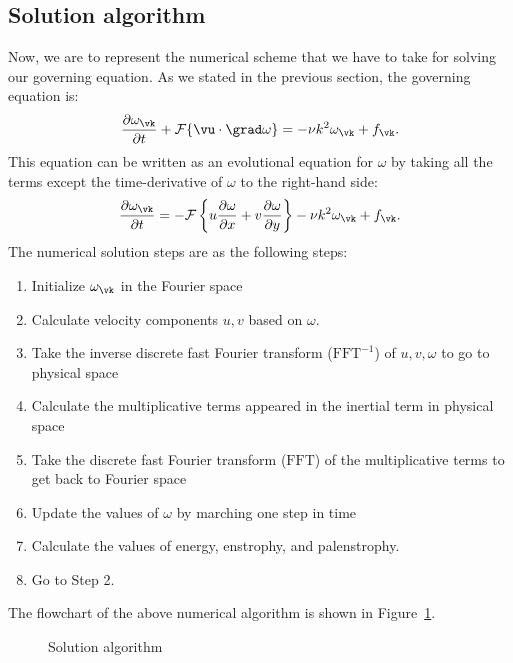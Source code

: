 \documentclass[12pt]{article}
\begin{document}
\subsection{Solution algorithm}
Now, we are to represent the numerical scheme that we have to take for solving our governing equation. As we stated in the previous section, the governing equation is:
\begin{equation}\label{Eq-13}
\frac{\partial\omega_{\vk}}{\partial t} + \mathcal{F}\{\vu\cdot\grad\omega\}= -\nu{k}^2\omega_{\vk} + f_{\vk}.
\end{equation}
%
This equation can be written as an evolutional equation for $\omega$ by taking all the terms except the time-derivative of $\omega$ to the right-hand side:
\begin{equation}\label{Eq-14}
\frac{\partial\omega_{\vk}}{\partial t} =- \mathcal{F}\left\lbrace u\dfrac{\partial \omega}{\partial x}+v\dfrac{\partial \omega}{\partial y}\right\rbrace -\nu k^2\omega_{\vk} + f_{\vk}.
\end{equation}
%
The numerical solution steps are as the following steps:
\begin{enumerate}
\item Initialize $\omega_{\vk}$ in the Fourier space
\item Calculate velocity components $u,v$ based on $\omega$.
\item Take the inverse discrete fast Fourier transform ($\text{FFT}^{-1}$) of $u,v,\omega$ to go to physical space
\item Calculate the multiplicative terms appeared in the inertial term in physical space
\item Take the discrete fast Fourier transform ($\text{FFT}$) of the multiplicative terms to get back to Fourier space
\item Update the values of $\omega$ by marching one step in time
\item Calculate the values of energy, enstrophy, and palenstrophy.
\item Go to Step 2.
\end{enumerate}
The flowchart of the above numerical algorithm is shown in Figure~\ref{algorithm}.
\begin{figure}[ht]
\begin{center}
\caption{Solution algorithm}\label{algorithm}
\end{center}
\end{figure}
\end{document}
